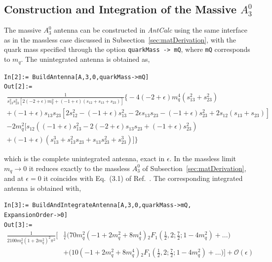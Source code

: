 \subsection{Construction and Integration of the Massive $A_3^0$}

The massive $A_3^0$ antenna can be constructed in \textit{AntCalc} using the same interface as
in the massless case discussed in Subsection~\ref{sec:matDerivation}, with the quark mass specified
through the option \texttt{quarkMass -> mQ}, where \texttt{mQ} corresponds to $m_q$. The
unintegrated antenna is obtained as,

\begin{mdframed}[backgroundcolor=gray!10, linewidth=0pt]
\texttt{In[2]:= BuildAntenna[A,3,0,quarkMass->mQ]}\\
\hfill
\texttt{Out[2]:=}
    \begin{equation*}
        \begin{gathered}
            \frac{1}{s_{13}^2s_{23}^2\left[2(-2+\epsilon)m_q^2+(-1+\epsilon)(s_{12}+s_{13}+s_{23})\right]}\Big\{-4(-2+\epsilon)m_q^4\left(s_{13}^2+s_{23}^2\right)\\
            +(-1+\epsilon)s_{13}s_{23}\left[2s_{12}^2-(-1+\epsilon)s_{13}^2-2\epsilon s_{13}s_{23}-(-1+\epsilon)s_{23}^2+2s_{12}(s_{13}+s_{23})\right]\\
            -2m_q^2\Big[s_{12}\left((-1+\epsilon)s_{13}^2-2(-2+\epsilon)s_{13}s_{23}+(-1+\epsilon)s_{23}^2\right)\\
            +(-1+\epsilon)\left(s_{13}^3+s_{13}^2s_{23}+s_{13}s_{23}^2+s_{23}^3\right)\Big]\Big\}
        \end{gathered}
    \end{equation*}
\end{mdframed}

which is the complete unintegrated antenna, exact in $\epsilon$. In the massless limit $m_q\to0$ it reduces
exactly to the massless $A_3^0$ of Subsection~\ref{sec:matDerivation}, and at $\epsilon=0$ it coincides with
Eq.~(3.1) of Ref.~\cite{GehrmannDeRidder:2009fz}. The corresponding integrated antenna is
obtained with,

\begin{mdframed}[backgroundcolor=gray!10, linewidth=0pt]
\texttt{In[3]:= BuildAndIntegrateAntenna[A,3,0,quarkMass->mQ,\\ExpansionOrder->0]}\\
\hfill
\texttt{Out[3]:=}
    \begin{equation*}
        \begin{split}
            \frac1{2100m_q^2\!\left(1+2m_q^2\right)^2\pi^2}\Bigg[&\frac1\epsilon\Bigg(70m_q^2\!\left(-1+2m_q^2+8m_q^4\right){}_2F_1\!\left(\frac12,2;\frac72;1-4m_q^2\right)+...\Bigg)\\
                                                                 &+\Bigg(10\!\left(-1+2m_q^2+8m_q^4\right){}_2F_1\!\left(\frac12,2;\frac72;1-4m_q^2\right)+...\Bigg)\Bigg] + \mathcal O(\epsilon)
        \end{split}
    \end{equation*}
\end{mdframed}

